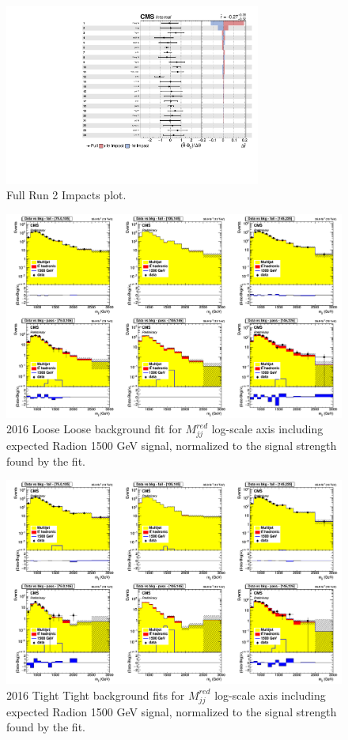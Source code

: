 \begin{figure}[!htb]
	\centering
	\includegraphics[width=0.75\textwidth]{Figures/impacts_byYear.pdf}
	\caption{Full Run 2 Impacts plot.}
	\label{fig:ImpactsplotAppend}
\end{figure}
\begin{figure}[!htb]
	\centering
	\includegraphics[width=1\textwidth]{Figures/postfit_projy_fits_log_16LL.png}
	\caption{2016 Loose Loose background fit for $M_{jj}^{red}$ log-scale axis including expected Radion 1500 GeV signal, normalized to the signal strength found by the fit.}
	\label{fig:16LLlog}
\end{figure}
\begin{figure}[!htb]
	\centering
	\includegraphics[width=1\textwidth]{Figures/postfit_projy_fits_log_16TT.png}
	\caption{2016 Tight Tight background fits for $M_{jj}^{red}$ log-scale axis including expected Radion 1500 GeV signal, normalized to the signal strength found by the fit.}
	\label{fig:16TTlog}
\end{figure}
